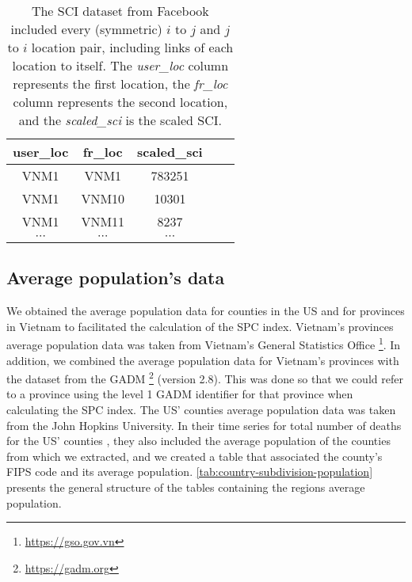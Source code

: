 \begin{table}[h]
\centering
\begin{tabular}{| c | c | c | c | c |}
    user\_loc & fr\_loc & scaled\_sci \\
    \hline\hline
    VNM1 & VNM1 & 783251 \\
    \hline
    VNM1 & VNM10 & 10301 \\
    \hline
    VNM1 & VNM11 & 8237 \\
    \hline
    $\cdots$ & $\cdots$ & $\cdots$ \\
\end{tabular}
\caption{The \gls{SCI} dataset from Facebook included every (symmetric) $i$ to $j$ and $j$ to $i$ location pair, including links of each location to itself. The \textit{user\_loc} column represents the first location, the \textit{fr\_loc} column represents the second location, and the \textit{scaled\_sci} is the scaled \gls{SCI}.}
\label{tab:facebook-social-connectedness-index}
\end{table}

\subsection{Average population's data}

We obtained the average population data for counties in the \gls{US} and for provinces in Vietnam to facilitated the calculation of the \gls{SPC} index.
Vietnam's provinces average population data was taken from Vietnam's General Statistics Office \footnote{\url{https://gso.gov.vn}}.
In addition, we combined the average population data for Vietnam's provinces with the dataset from the \gls{GADM} \footnote{\url{https://gadm.org}} (version 2.8).
This was done so that we could refer to a province using the level 1 \gls{GADM} identifier for that province when calculating the \gls{SPC} index.
The \gls{US}' counties average population data was taken from the John Hopkins University.
In their time series for total number of deaths for the \gls{US}' counties \cite{dongInteractiveWebbasedDashboard2020}, they also included the average population of the counties from which we extracted, and we created a table that associated the county's \gls{FIPS} code and its average population.
\autoref{tab:country-subdivision-population} presents the general structure of the tables containing the regions average population.

